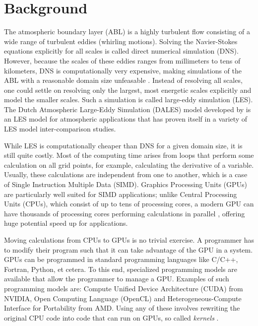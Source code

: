 \section{Background}
The atmospheric boundary layer (ABL) is a highly turbulent flow consisting of a wide range of turbulent eddies (whirling motions). Solving the Navier-Stokes equations explicitly for all scales is called direct numerical simulation (DNS). However, because the scales of these eddies ranges from millimeters to tens of kilometers, DNS is computationally very expensive, making simulations of the ABL with a reasonable domain size unfeasable \citep{moengNUMERICALMODELSLargeEddy2015}. Instead of resolving all scales, one could settle on resolving only the largest, most energetic scales explicitly and model the smaller scales. Such a simulation is called large-eddy simulation (LES). The Dutch Atmospheric Large-Eddy Simulation (DALES) model developed by \citet{heusFormulationDutchAtmospheric2010} is an LES model for atmospheric applications that has proven itself in a variety of LES model inter-comparison studies.

While LES is computationally cheaper than DNS for a given domain size, it is still quite costly. Most of the computing time arises from loops that perform some calculation on all grid points, for example, calculating the derivative of a variable. Usually, these calculations are independent from one to another, which is a case of Single Instruction Multiple Data (SIMD). Graphics Processing Units (GPUs) are particularly well suited for SIMD applications; unlike Central Processing Units (CPUs), which consist of up to tens of processing cores, a modern GPU can have thousands of processing cores performing calculations in parallel \citep{elsterNvidiaHopperGPU2022}, offering huge potential speed up for applications. 

Moving calculations from CPUs to GPUs is no trivial exercise. A programmer has to modify their program such that it can take advantage of the GPU in a system. GPUs can be programmed in standard programming languages like C/C++, Fortran, Python, et cetera. To this end, specialized programming models are available that allow the programmer to manage a GPU. Examples of such programming models are: Compute Unified Device Architecture (CUDA) from NVIDIA, Open Computing Language (OpenCL) and Heterogeneous-Compute Interface for Portability from AMD. Using any of these involves rewriting the original CPU code into code that can run on GPUs, so called \emph{kernels} .

